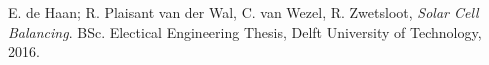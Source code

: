 \documentclass[a4paper,journal]{DDREAM}
\begin{document}




\ifCLASSOPTIONcaptionsoff
  \newpage
\fi



%
%
%

\begin{thebibliography}{1}

E. de Haan; R. Plaisant van der Wal, C. van Wezel, R. Zwetsloot, \emph{Solar Cell Balancing}. BSc. Electical Engineering Thesis, Delft University of Technology, 2016.

\end{thebibliography}
\end{document}
